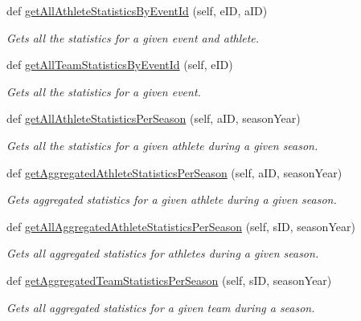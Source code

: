\begin{DoxyCompactItemize}
def \hyperlink{classhandler_1_1baseball__event_1_1_baseball_event_handler_a79189c942e87b9b2ec03bf567df29303}{get\+All\+Athlete\+Statistics\+By\+Event\+Id} (self, e\+ID, a\+ID)
\begin{DoxyCompactList}\small\item\em Gets all the statistics for a given event and athlete. \end{DoxyCompactList}\item 
def \hyperlink{classhandler_1_1baseball__event_1_1_baseball_event_handler_ad49735763de5b2b6be35b8d859c93f87}{get\+All\+Team\+Statistics\+By\+Event\+Id} (self, e\+ID)
\begin{DoxyCompactList}\small\item\em Gets all the statistics for a given event. \end{DoxyCompactList}\item 
def \hyperlink{classhandler_1_1baseball__event_1_1_baseball_event_handler_a501eccbe7b2294ac4213a8fd53b55216}{get\+All\+Athlete\+Statistics\+Per\+Season} (self, a\+ID, season\+Year)
\begin{DoxyCompactList}\small\item\em Gets all the statistics for a given athlete during a given season. \end{DoxyCompactList}\item 
def \hyperlink{classhandler_1_1baseball__event_1_1_baseball_event_handler_adb2324b1ab5fd1dab159be82e8760530}{get\+Aggregated\+Athlete\+Statistics\+Per\+Season} (self, a\+ID, season\+Year)
\begin{DoxyCompactList}\small\item\em Gets aggregated statistics for a given athlete during a given season. \end{DoxyCompactList}\item 
def \hyperlink{classhandler_1_1baseball__event_1_1_baseball_event_handler_afb792b9f57594ce09c7c712dac3456a5}{get\+All\+Aggregated\+Athlete\+Statistics\+Per\+Season} (self, s\+ID, season\+Year)
\begin{DoxyCompactList}\small\item\em Gets all aggregated statistics for athletes during a given season. \end{DoxyCompactList}\item 
def \hyperlink{classhandler_1_1baseball__event_1_1_baseball_event_handler_a269a527fd885804acde180e292145ed7}{get\+Aggregated\+Team\+Statistics\+Per\+Season} (self, s\+ID, season\+Year)
\begin{DoxyCompactList}\small\item\em Gets all aggregated statistics for a given team during a season. \end{DoxyCompactList}\item 

\end{DoxyCompactItemize}
